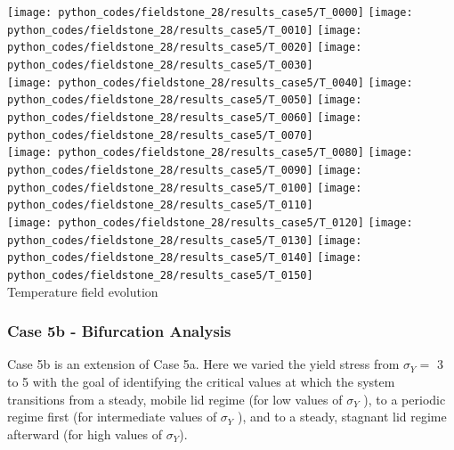 \newpage
\noindent
\begin{center}
\texttt{[image: python\_codes/fieldstone\_28/results\_case5/T\_0000]}
\texttt{[image: python\_codes/fieldstone\_28/results\_case5/T\_0010]}
\texttt{[image: python\_codes/fieldstone\_28/results\_case5/T\_0020]}
\texttt{[image: python\_codes/fieldstone\_28/results\_case5/T\_0030]}\\
\texttt{[image: python\_codes/fieldstone\_28/results\_case5/T\_0040]}
\texttt{[image: python\_codes/fieldstone\_28/results\_case5/T\_0050]}
\texttt{[image: python\_codes/fieldstone\_28/results\_case5/T\_0060]}
\texttt{[image: python\_codes/fieldstone\_28/results\_case5/T\_0070]}\\
\texttt{[image: python\_codes/fieldstone\_28/results\_case5/T\_0080]}
\texttt{[image: python\_codes/fieldstone\_28/results\_case5/T\_0090]}
\texttt{[image: python\_codes/fieldstone\_28/results\_case5/T\_0100]}
\texttt{[image: python\_codes/fieldstone\_28/results\_case5/T\_0110]}\\
\texttt{[image: python\_codes/fieldstone\_28/results\_case5/T\_0120]}
\texttt{[image: python\_codes/fieldstone\_28/results\_case5/T\_0130]}
\texttt{[image: python\_codes/fieldstone\_28/results\_case5/T\_0140]}
\texttt{[image: python\_codes/fieldstone\_28/results\_case5/T\_0150]}\\
{\captionfont Temperature field evolution}
\end{center}

\subsubsection*{Case 5b - Bifurcation Analysis}

Case 5b is an extension of Case 5a. Here we varied the yield stress from $\sigma_Y=$ 3 to 5 with the goal of identifying 
the critical values at which the system transitions from a steady, mobile lid regime (for low values of $\sigma_Y$ ),
to a periodic regime first (for intermediate values of $\sigma_Y$ ), and to a steady, stagnant lid regime afterward (for
high values of $\sigma_Y$).


